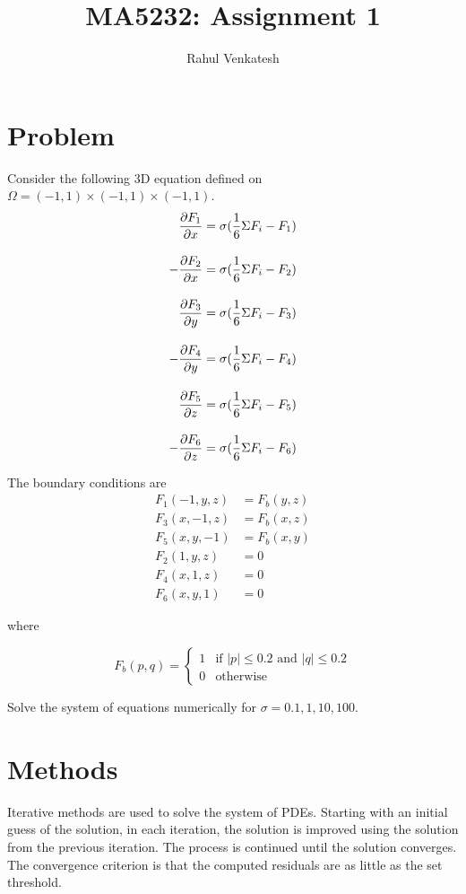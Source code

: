 \documentclass[11pt,titlepage]{article}
\title{
    \HRule\\[0.3cm]
    MA5232: Assignment 1
    \HRule\\[0.3cm]
}
\author{Rahul Venkatesh}
\begin{document}
{\let\newpage\relax\maketitle}
\tableofcontents

\section{Problem}
Consider the following 3D equation defined on $\Omega = (-1, 1) \times (-1, 1) \times (-1, 1)$.
\begin{align*}
    \pdv{F_1}{x} &= \sigma (\frac{1}{6} \Sigma F_i - F_1) \\[1em]
    -\pdv{F_2}{x} &= \sigma (\frac{1}{6} \Sigma F_i - F_2) \\[1em]
    \pdv{F_3}{y} &= \sigma (\frac{1}{6} \Sigma F_i - F_3) \\[1em]
    -\pdv{F_4}{y} &= \sigma (\frac{1}{6} \Sigma F_i - F_4) \\[1em]
    \pdv{F_5}{z} &= \sigma (\frac{1}{6} \Sigma F_i - F_5) \\[1em]
    -\pdv{F_6}{z} &= \sigma (\frac{1}{6} \Sigma F_i - F_6)
\end{align*}

The boundary conditions are
\begin{align*}
    F_1(-1, y, z) &= F_b(y, z) \\
    F_3(x, -1, z) &= F_b(x, z) \\
    F_5(x, y, -1) &= F_b(x, y) \\
    F_2(1, y, z) &= 0 \\
    F_4(x, 1, z) &= 0 \\
    F_6(x, y, 1) &= 0
\end{align*}

where

$$
F_b(p, q) =
\begin{cases}
    1 & \text{if } |p| \le 0.2 \text{ and } |q| \le 0.2 \\
    0 & \text{otherwise}
\end{cases}
$$

Solve the system of equations numerically for $\sigma  = 0.1, 1, 10, 100$.

\newpage
\section{Methods}

Iterative methods are used to solve the system of PDEs. Starting with an initial guess of the solution, in each
iteration, the solution is improved using the solution from the previous iteration. The process is continued until the
solution converges. The convergence criterion is that the computed residuals are as little as the set threshold.
\end{document}
